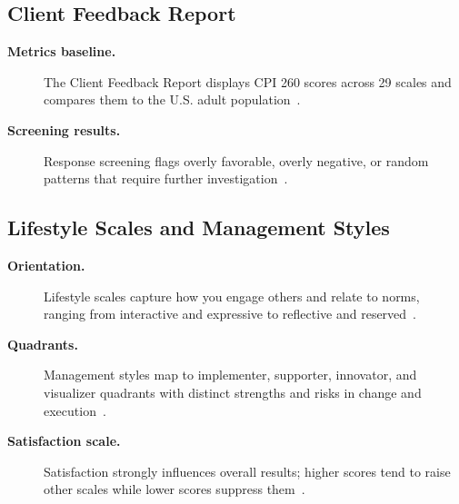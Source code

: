 \documentclass[../main.tex]{subfiles}
\begin{document}
\subsection{Client Feedback Report}
\begin{description}
  \item[\textbf{Metrics baseline.}] The Client Feedback Report displays CPI 260 scores across 29 scales and compares them to the U.S. adult population~\autocite{edo-5-1-9-cpi-260-2025}.
  \item[\textbf{Screening results.}] Response screening flags overly favorable, overly negative, or random patterns that require further investigation~\autocite{edo-5-1-9-cpi-260-2025}.
\end{description}

\subsection{Lifestyle Scales and Management Styles}
\begin{description}
  \item[\textbf{Orientation.}] Lifestyle scales capture how you engage others and relate to norms, ranging from interactive and expressive to reflective and reserved~\autocite{edo-5-1-9-cpi-260-2025}.
  \item[\textbf{Quadrants.}] Management styles map to implementer, supporter, innovator, and visualizer quadrants with distinct strengths and risks in change and execution~\autocite{edo-5-1-9-cpi-260-2025}.
  \item[\textbf{Satisfaction scale.}] Satisfaction strongly influences overall results; higher scores tend to raise other scales while lower scores suppress them~\autocite{edo-5-1-9-cpi-260-2025}.
\end{description}
\end{document}
